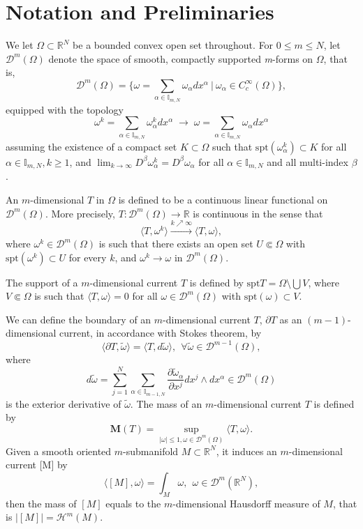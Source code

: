 \documentclass{amsart}
\numberwithin{equation}{section}
\theoremstyle{definition}
\theoremstyle{remark}
\newcommand{\R}{\mathbb{R}}
\begin{document}
\section{Notation and Preliminaries}
We let $\Omega \subset \mathbb{R}^N$ be {a bounded convex} open set throughout. 
{For $0\le m\le N$, l}et $\mathcal{D}^m(\Omega)$ 
{denote}  the space of smooth, compactly supported \textit{m}-forms on $\Omega$,  that {is,}
\[ \mathcal{D}^m(\Omega) = \Big\{ \omega = \sum_{\alpha\in \mathbb{I}_{m, N}} \omega_\alpha dx^\alpha \ \Big| \  \omega_\alpha \in C_c^\infty(\Omega) \Big\} ,\]
{equipped} with the topology 
\[ \omega^k = \sum_{\alpha \in \mathbb{I}_{m,N}} \omega^k_\alpha dx^\alpha \;  \longrightarrow \; \omega = \sum_{\alpha \in \mathbb{I}_{m,N}} \omega_\alpha dx^\alpha  \]
assuming the existence of a compact set $K \subset \Omega$ such that $\text{spt} (\omega^k_\alpha) \subset K$ for all 
$\alpha \in \mathbb{I}_{m, N}, k \geq 1$, and $\displaystyle\lim_{k\to\infty} D^\beta \omega^k_\alpha = D^\beta \omega_\alpha$ for all $\alpha \in \mathbb{I}_{m,N}$ and all multi-index $\beta$. 

An $m$-dimensional  $T$ in $\Omega$ is {defined to be }a continuous linear functional on $\mathcal{D}^m(\Omega)$. 
More precisely, $T:\mathcal{D}^m(\Omega) \to \mathbb{R}$ is continuous in the sense that 
$$\big\langle T, \omega^k \big\rangle \xrightarrow{k\nearrow\infty} \big\langle T, \omega \big\rangle,$$ 
where $\omega^k \in \mathcal{D}^m(\Omega)$ is such that there exists an open set $U\Subset\Omega$ with 
$\text{spt}(\omega^k) \subset U$ for every $k$, and $\omega^k \to \omega$ in $\mathcal{D}^m(\Omega)$.

The support of a {$m$-dimensional} current $T$ 
is defined by $\text{spt} T = \Omega \setminus \bigcup V$, where $V \Subset\Omega$ is 
such that $\langle T, \omega \rangle =0$ for all $\omega \in \mathcal{D}^m(\Omega)$ with $\text{spt} (\omega) \subset V$.

We can define the boundary of an {$m$-dimensional} current $T$, {$\partial T$ as an $(m-1)$-
dimensional current,} in accordance with Stokes theorem, by 
\[ \big\langle \partial T, \tilde{\omega}\big\rangle  =\big \langle  T, d \tilde{\omega} \big\rangle, \ \ \forall\tilde{\omega}\in \mathcal{D}^{m-1}(\Omega), \]
where 
\[d \tilde{\omega} = \sum_{j=1}^N \sum_{\alpha \in \mathbb{I}_{m-1,N} } \frac{\partial \tilde{\omega}_\alpha}{\partial x^j} dx^j \wedge dx^\alpha
\in \mathcal{D}^m(\Omega) \]
is the exterior derivative of $\tilde{\omega}$.
The mass of an {$m$-dimensional} current $T$ is defined by 
\[\mathbf{M}(T) = \sup_{|\omega| \leq 1, \omega \in \mathcal{D}^m(\Omega)} \big\langle T, \omega \big\rangle.\]
Given a smooth oriented $m$-submanifold $M \subset \mathbb{R}^N$, {it induces an $m$-dimensional current [M] by}
$$\big\langle [M], \omega \big\rangle = \int_M \omega, \ \ \omega\in \mathcal{D}^m(\R^N),$$
then {the mass of $[M]$ equals to the $m$-dimensional Hausdorff measure of $M$, that is} $\big|[M]\big| = \mathcal{H}^m(M)$.
\end{document}
